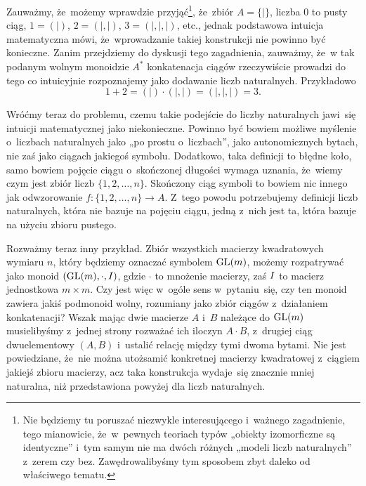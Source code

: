 \documentclass[a4paper,11pt]{article}
\begin{document}
Zauważmy, że~możemy wprawdzie przyjąć\footnote{Nie będziemy tu
  poruszać niezwykle interesującego i~ważnego zagadnienie, tego
  mianowicie, że~w~pewnych teoriach typów „obiekty izomorficzne są
  identyczne” i~tym samym nie ma dwóch różnych „modeli liczb
  naturalnych” z~zerem czy bez. Zawędrowalibyśmy tym sposobem zbyt
  daleko od właściwego tematu.}, że~zbiór $A = \{ | \}$, liczba $0$ to
pusty ciąg, $1 = ( | )$, $2 = ( |, | )$, $3 = ( |, |, | )$, etc.,
jednak podstawowa intuicja matematyczna mówi, że~wprowadzanie takiej
konstrukcji nie powinno być konieczne. Zanim przejdziemy do dyskusji
tego zagadnienia, zauważmy, że~w tak podanym wolnym monoidzie
$A^{ * }$ konkatenacja ciągów rzeczywiście prowadzi do tego co
intuicyjnie rozpoznajemy jako dodawanie liczb naturalnych. Przykładowo
\begin{equation}
  \label{eq:Forys-Forys-05}
  1 + 2 = ( | ) \cdot ( |, | ) = ( |, |, | ) = 3.
\end{equation}

Wróćmy teraz do problemu, czemu takie podejście do liczby naturalnych
jawi~się intuicji matematycznej jako niekonieczne. Powinno być bowiem
możliwe myślenie o~liczbach naturalnych jako „po prostu o~liczbach”,
jako autonomicznych bytach, nie zaś jako ciągach jakiegoś symbolu.
Dodatkowo, taka definicji to błędne koło, samo bowiem pojęcie ciągu
o~skończonej długości wymaga uznania, że~wiemy czym jest zbiór liczb
$\{ 1, 2, \ldots, n \}$. Skończony ciąg symboli to bowiem nic innego jak
odwzorowanie $f : \{ 1, 2, \ldots, n \} \to A$. Z~tego powodu potrzebujemy
definicji liczb naturalnych, która nie bazuje na pojęciu ciągu, jedną
z~nich jest ta, która bazuje na użyciu zbioru pustego.

Rozważmy teraz inny przykład. Zbiór wszystkich macierzy kwadratowych
wymiaru $n$, który będziemy oznaczać symbolem $\mathrm{GL}( m )$, możemy
rozpatrywać jako monoid $( \mathrm{GL}( m ), \cdot, I )$, gdzie $\cdot$
to mnożenie macierzy, zaś $I$ to macierz jednostkowa
$m \times m$. Czy jest więc w~ogóle sens w~pytaniu~się, czy
ten monoid zawiera jakiś podmonoid wolny, rozumiany jako zbiór ciągów
z~działaniem konkatenacji? Wszak mając dwie macierze $A$ i~$B$
należące do $\mathrm{GL}( m )$ musielibyśmy z~jednej strony rozważać ich
iloczyn $A \cdot B$, z~drugiej ciąg dwuelementowy $( A, B )$ i~ustalić
relację między tymi dwoma bytami. Nie jest powiedziane, że~nie można
utożsamić konkretnej macierzy kwadratowej z~ciągiem jakiejś zbioru
macierzy, acz taka konstrukcja wydaje~się znacznie mniej naturalna,
niż przedstawiona powyżej dla liczb naturalnych.
\end{document}
